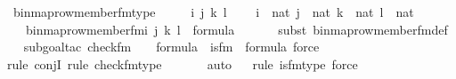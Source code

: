 \begin{isabellebody}
\isanewline
{}\isamarkupfalse%
\ binmap{\isacharunderscore}{\kern0pt}row{\isacharprime}{\kern0pt}{\isacharunderscore}{\kern0pt}member{\isacharunderscore}{\kern0pt}fm{\isacharunderscore}{\kern0pt}type\ {\isacharcolon}{\kern0pt}\ \isanewline
\ \ \ i\ j\ k\ l\ \isanewline
\ \ \ {\isachardoublequoteopen}i\ {\isasymin}\ nat{\isachardoublequoteclose}\ {\isachardoublequoteopen}j\ {\isasymin}\ nat{\isachardoublequoteclose}\ {\isachardoublequoteopen}k\ {\isasymin}\ nat{\isachardoublequoteclose}\ {\isachardoublequoteopen}l\ {\isasymin}\ nat{\isachardoublequoteclose}\ \isanewline
\ \ \ {\isachardoublequoteopen}binmap{\isacharunderscore}{\kern0pt}row{\isacharprime}{\kern0pt}{\isacharunderscore}{\kern0pt}member{\isacharunderscore}{\kern0pt}fm{\isacharparenleft}{\kern0pt}i{\isacharcomma}{\kern0pt}\ j{\isacharcomma}{\kern0pt}\ k{\isacharcomma}{\kern0pt}\ l{\isacharparenright}{\kern0pt}\ {\isasymin}\ formula{\isachardoublequoteclose}\ \isanewline
%
\isadelimproof
\ \ \isanewline
\ \ %
\endisadelimproof
%
\isatagproof
{}\isamarkupfalse%
{\isacharparenleft}{\kern0pt}subst\ binmap{\isacharunderscore}{\kern0pt}row{\isacharprime}{\kern0pt}{\isacharunderscore}{\kern0pt}member{\isacharunderscore}{\kern0pt}fm{\isacharunderscore}{\kern0pt}def{\isacharparenright}{\kern0pt}\isanewline
\ \ \isamarkupfalse%
{\isacharparenleft}{\kern0pt}subgoal{\isacharunderscore}{\kern0pt}tac\ {\isachardoublequoteopen}check{\isacharunderscore}{\kern0pt}fm{\isacharparenleft}{\kern0pt}{}{\isacharcomma}{\kern0pt}\ {}{\isacharcomma}{\kern0pt}\ {}{\isacharparenright}{\kern0pt}\ {\isasymin}\ formula\ {\isasymand}\ is{\isacharunderscore}{\kern0pt}{}{\isacharunderscore}{\kern0pt}fm{\isacharparenleft}{\kern0pt}{}{\isacharparenright}{\kern0pt}\ {\isasymin}\ formula{\isachardoublequoteclose}{\isacharcomma}{\kern0pt}\ force{\isacharparenright}{\kern0pt}\isanewline
\ \ \isamarkupfalse%
{\isacharparenleft}{\kern0pt}rule\ conjI{\isacharcomma}{\kern0pt}\ rule\ check{\isacharunderscore}{\kern0pt}fm{\isacharunderscore}{\kern0pt}type{\isacharparenright}{\kern0pt}\isanewline
\ \ \ \ \ \isamarkupfalse%
\ auto{\isacharbrackleft}{\kern0pt}{}{\isacharbrackright}{\kern0pt}\isanewline
\ \ \isamarkupfalse%
{\isacharparenleft}{\kern0pt}rule\ is{\isacharunderscore}{\kern0pt}{}{\isacharunderscore}{\kern0pt}fm{\isacharunderscore}{\kern0pt}type{\isacharcomma}{\kern0pt}\ force{\isacharparenright}{\kern0pt}\isanewline

\end{isabellebody}
